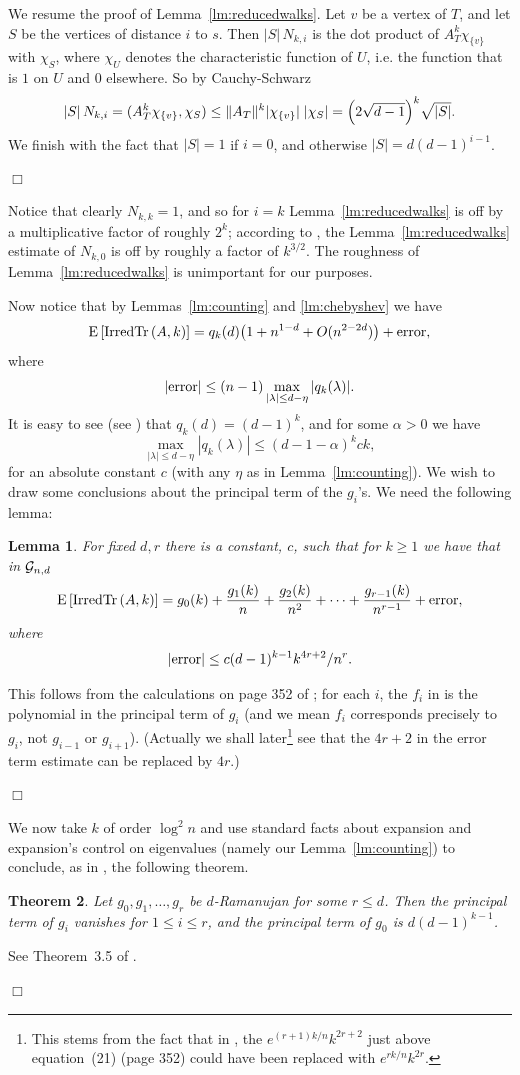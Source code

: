 \documentclass[12pt]{article}
\newtheorem{theorem}{Theorem}[section]
\newtheorem{lemma}[theorem]{Lemma}
\newcommand{\dtreelike}{{$d$-Ramanujan}}
\newcommand{\cg}{{\cal G}}
\newcommand{\cgnd}{\cg_{n,d}}
\newcommand{\irdtr}[2]{{\rm IrredTr}\left(#1,#2\right)}
\newcommand{\E}[1]{\mbox{E}\left[#1\right] }
\newcommand{\proof}{{\par\noindent {\bf Proof}\space\space}}
\newcommand{\proofbox}{\begin{flushright}$\Box$\end{flushright}}
\begin{document}
We resume the proof of Lemma~\ref{lm:reducedwalks}.
Let $v$ be a vertex of $T$, and let $S$ be the vertices
of distance $i$ to $s$.  Then $|S|\,N_{k,i}$ is the dot product of 
$A_T^k\chi_{\{v\}}$
with $\chi_S$, where $\chi_U$ denotes the characteristic function of $U$,
i.e. the function that is $1$ on $U$ and $0$ elsewhere.
So by Cauchy-Schwarz
$$
|S|\,N_{k,i}=(A_T^k\chi_{\{v\}},\chi_S)\le \|A_T\|^k |\chi_{\{v\}}| \;
|\chi_S| = \Bigl( 2\sqrt{d-1}\Bigr)^k \sqrt{|S|}.
$$
We finish with the fact that $|S|=1$ if $i=0$, and otherwise
$|S|=d(d-1)^{i-1}$.
\proofbox
Notice that clearly $N_{k,k}=1$, and so for $i=k$
Lemma~\ref{lm:reducedwalks}
is off by a multiplicative factor
of roughly
$2^k$; according to \cite{mckay,figa-talamanca_picardello}, the
Lemma~\ref{lm:reducedwalks}
estimate of $N_{k,0}$ is off by roughly a factor of $k^{3/2}$.  The
roughness of Lemma~\ref{lm:reducedwalks} is unimportant for our purposes.

Now notice that by Lemmas~\ref{lm:counting} and \ref{lm:chebyshev} we have
$$
\E{\irdtr{A}{k}} = q_k(d)\bigl( 1+n^{1-d}+O(n^{2-2d})\bigr) + 
{\rm error},
$$
where
$$
|{\rm error}| \le
(n-1)\max_{|\lambda|\le d-\eta} |q_k(\lambda)|.
$$
It is easy to see (see \cite{friedman_random_graphs}) that
$q_k(d)=(d-1)^k$, and for some $\alpha>0$ we have
$$
\max_{|\lambda|\le d-\eta} |q_k(\lambda)| \le (d-1-\alpha)^k ck,
$$
for an absolute constant $c$ (with any $\eta$ as in
Lemma~\ref{lm:counting}).  We wish to draw some conclusions about
the principal term of the $g_i$'s.  We need the following
lemma:
\begin{lemma} For fixed $d,r$ there is a constant, $c$, such that
for $k\ge 1$ we have that in $\cgnd$
$$
\E{\irdtr{A}{k}} = g_0(k)+\frac{g_1(k)}{n} + \frac{g_2(k)}{n^2} + \cdots
+ \frac{g_{r-1}(k)}{n^{r-1}} + {\rm error},
$$
where
$$
|{\rm error}| \le  c (d-1)^{k-1}k^{4r+2}/n^{r}.
$$
\end{lemma}
\proof This follows from the calculations on page 352 of
\cite{friedman_random_graphs}; for each $i$, the $f_i$ in
\cite{friedman_random_graphs} is the polynomial in the principal
term of $g_i$ (and we mean $f_i$ corresponds precisely to $g_i$, not
$g_{i-1}$ or $g_{i+1}$).  (Actually we shall later\footnote{
	This stems from the fact that in \cite{friedman_random_graphs},
	the $e^{(r+1)k/n}k^{2r+2}$ just above equation~(21) (page 352)
	could have been replaced with $e^{rk/n}k^{2r}$.
} see that the
$4r+2$ in the error term estimate can be replaced by $4r$.)
\proofbox
We now take $k$ of order $\log^2n$ and use standard facts about
expansion and expansion's control on eigenvalues (namely our
Lemma~\ref{lm:counting})
to conclude, as in
\cite{friedman_random_graphs}, the following theorem.
\begin{theorem}\label{th:f_ivalues}
Let $g_0,g_1,\ldots,g_r$ be {\dtreelike}
for some $r\le d$.  Then the principal term of $g_i$ vanishes for 
$1\le i \le r$, and the principal term of $g_0$ is $d(d-1)^{k-1}$.
\end{theorem}
\proof See Theorem~3.5 of \cite{friedman_random_graphs}.
\proofbox
\end{document}
